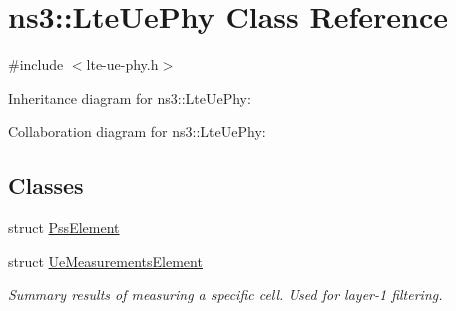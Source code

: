 \hypertarget{classns3_1_1LteUePhy}{}\section{ns3\+:\+:Lte\+Ue\+Phy Class Reference}
\label{classns3_1_1LteUePhy}


{\ttfamily \#include $<$lte-\/ue-\/phy.\+h$>$}



Inheritance diagram for ns3\+:\+:Lte\+Ue\+Phy\+:


Collaboration diagram for ns3\+:\+:Lte\+Ue\+Phy\+:
\subsection*{Classes}
\begin{DoxyCompactItemize}
\item 
struct \hyperlink{structns3_1_1LteUePhy_1_1PssElement}{Pss\+Element}
\item 
struct \hyperlink{structns3_1_1LteUePhy_1_1UeMeasurementsElement}{Ue\+Measurements\+Element}
\begin{DoxyCompactList}\small\item\em Summary results of measuring a specific cell. Used for layer-\/1 filtering. \end{DoxyCompactList}\end{DoxyCompactItemize}
